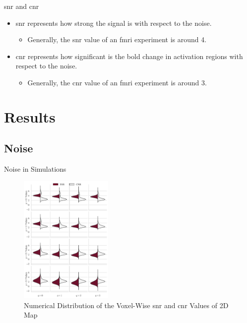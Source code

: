 \documentclass{beamer}
\begin{document}
\begin{frame}{\acrshort{snr} and \acrshort{cnr}}
\begin{itemize}
\item \acrfull{snr} represents how strong the signal is with respect to the noise.
\begin{itemize}
\item Generally, the \gls{snr} value of an \gls{fmri} experiment is around 4.
\end{itemize}
\item \acrfull{cnr} represents how significant is the \gls{bold} change in 
activation regions with respect to the noise.
\begin{itemize}
\item Generally, the \gls{cnr} value of an \gls{fmri} experiment is around 3.
\end{itemize}
\end{itemize}
\end{frame}

\section{Results}

\subsection{Noise}

\begin{frame}{Noise in Simulations}
\begin{figure}
\centering
\includegraphics[width=0.4\textwidth]{Images/cnrsnr2D.png}
\caption{Numerical Distribution of the Voxel-Wise \gls{snr} and \gls{cnr} Values of 2D Map}
\end{figure}
\end{frame}
\end{document}
